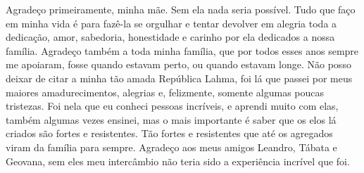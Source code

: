 \begin{agradecimentos}
Agradeço primeiramente, minha mãe. Sem ela nada seria possível. Tudo que faço em minha vida é para fazê-la se orgulhar e tentar devolver em alegria toda
a dedicação, amor, sabedoria, honestidade e carinho por ela dedicados a nossa família. Agradeço também a toda minha família, que por todos esses anos sempre me apoiaram, 
fosse quando estavam perto, ou quando estavam longe. 
Não posso deixar de citar a minha tão amada República Lahma, foi lá que passei por meus maiores amadurecimentos, alegrias e, felizmente, somente algumas poucas tristezas. 
Foi nela que eu conheci pessoas incríveis, e aprendi muito com elas, também algumas vezes ensinei, mas o mais importante é saber que os elos lá criados são fortes e resistentes.
Tão fortes e resistentes que até os agregados viram da família para sempre. Agradeço aos meus amigos Leandro, Tábata e Geovana, sem eles meu intercâmbio não teria sido 
a experiência incrível que foi. 
\end{agradecimentos}
\newpage